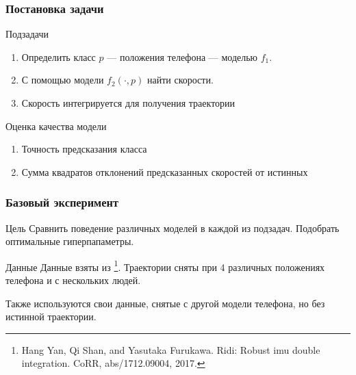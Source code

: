 \documentclass{beamer}
\begin{document}
\begin{frame}
\frametitle{Постановка задачи}
\begin{block}{Подзадачи}
\begin{enumerate}
\item Определить класс $p$ --- положения телефона --- моделью $f_1$. 
\item С помощью модели $f_2(\cdot, p)$ найти скорости.
\item Скорость интегрируется для получения траектории
\end{enumerate}
\end{block}

\begin{block}{Оценка качества модели}
    \begin{enumerate}
        \item Точность предсказания класса 
        \item Сумма квадратов отклонений предсказанных скоростей от истинных
    \end{enumerate}
    
\end{block}

\end{frame}

\begin{frame}
\frametitle{Базовый эксперимент} %
\begin{block}{Цель}
    Сравнить поведение различных моделей в каждой из подзадач. %
     Подобрать оптимальные гиперпапаметры.
\end{block}

\begin{block}{Данные}
    Данные взяты из \footnote{Hang Yan, Qi Shan, and Yasutaka Furukawa. Ridi: Robust imu double integration. CoRR, abs/1712.09004, 2017.}. 
    Траектории сняты при 4 различных положениях телефона и с нескольких людей.
    
    Также используются свои данные, снятые с другой модели телефона, но без истинной траектории.
\end{block}


\end{frame}
\end{document}
